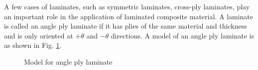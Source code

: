\documentclass[letterpaper]{IEEEtran}
\begin{document}
A few cases of laminates, such as symmetric laminates, cross-ply laminates, play
an important role in the application of laminated composite material. A laminate
is called an angle ply laminate if it has plies of the same material and
thickness and is only oriented at $+\theta$ and $-\theta$ directions. A model of
an angle ply laminate is as shown in Fig. \ref{fig:angle-ply}.

\begin{figure}[b]
\centering
{}
\caption{Model for angle ply laminate}
\label{fig:angle-ply}
\end{figure}
\end{document}
